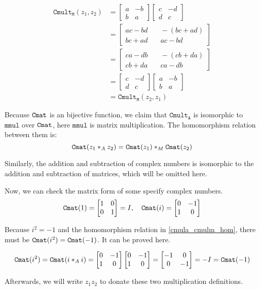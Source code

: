 \documentclass[runningheads,a4paper,english]{llncs}[2022/01/12]
\newcommand{\bmatL}{\begin{bmatrix}}
\newcommand{\bmatR}{\end{bmatrix}}
\begin{document}
\begin{equation}\label{cmult_comm_proof_matrix}
  \begin{aligned}
    \mathtt{Cmult_M}(z_1,z_2)
    &=\bmatL a&-b\\b&a\bmatR \bmatL c&-d\\d&c\bmatR  \\
    &=\bmatL ac-bd&\quad -(bc+ad)\\bc+ad&\quad ac-bd\bmatR \\
    &=\bmatL ca-db&\quad -(cb+da)\\cb+da&\quad ca-db\bmatR \\
    &=\bmatL c&-d\\d&c\bmatR \bmatL a&-b\\b&a\bmatR  \\
    &=\mathtt{Cmult_M}(z_2,z_1)
  \end{aligned}
\end{equation}

Because $\Cmat$ is an bijective function, we claim that $\mathtt{Cmult_A}$ is isomorphic to $\mathtt{mmul}$ over $\Cmat$,
here $\mathtt{mmul}$ is matrix multiplication.
The homomorphism relation between them is:
\begin{equation}\label{cmula_cmulm_hom}
  \Cmat(z_1 *_A z_2)=\Cmat(z_1) *_M \Cmat(z_2)
\end{equation}

Similarly, the addition and subtraction of complex numbers is isomorphic to the addition and subtraction of matrices, which will be omitted here.

Now, we can check the matrix form of some specify complex numbers.
\begin{equation}
  \Cmat{1}=\bmatL 1&0\\0&1\bmatR =I,\quad
  \Cmat{i}=\bmatL 0&-1\\1&0\bmatR 
\end{equation}

Because $i^2=-1$ and the homomorphism relation in \eqref{cmula_cmulm_hom}, there must be $\Cmat{i^2}=\Cmat{-1}$.
It can be proved here.

\begin{equation}
  \Cmat{i^2}=\Cmat{i *_A i}
  =\bmatL 0&-1\\1&0\bmatR \bmatL 0&-1\\1&0\bmatR 
  =\bmatL -1&0\\0&-1\bmatR 
  =-I
  =\Cmat{-1}
\end{equation}

Afterwards, we will write $z_1z_2$ to donate these two multiplication definitions.
\end{document}
